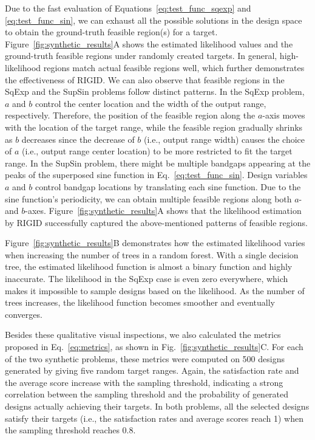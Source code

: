 \documentclass{article}
\begin{document}
Due to the fast evaluation of Equations~\ref{eq:test_func_sqexp} and \ref{eq:test_func_sin}, we can exhaust all the possible solutions in the design space to obtain the ground-truth feasible region(s) for a target. Figure~\ref{fig:synthetic_results}A shows the estimated likelihood values and the ground-truth feasible regions under randomly created targets. In general, high-likelihood regions match actual feasible regions well, which further demonstrates the effectiveness of RIGID. We can also observe that feasible regions in the SqExp and the SupSin problems follow distinct patterns. In the SqExp problem, $a$ and $b$ control the center location and the width of the output range, respectively. Therefore, the position of the feasible region along the $a$-axis moves with the location of the target range, while the feasible region gradually shrinks as $b$ decreases since the decrease of $b$ (i.e., output range width) causes the choice of $a$ (i.e., output range center location) to be more restricted to fit the target range. In the SupSin problem, there might be multiple bandgaps appearing at the peaks of the superposed sine function in Eq.~\ref{eq:test_func_sin}. Design variables $a$ and $b$ control bandgap locations by translating each sine function. Due to the sine function's periodicity, we can obtain multiple feasible regions along both $a$- and $b$-axes.
Figure~\ref{fig:synthetic_results}A shows that the likelihood estimation by RIGID successfully captured the above-mentioned patterns of feasible regions.

Figure~\ref{fig:synthetic_results}B demonstrates how the estimated likelihood varies when increasing the number of trees in a random forest. With a single decision tree, the estimated likelihood function is almost a binary function and highly inaccurate. The likelihood in the SqExp case is even zero everywhere, which makes it impossible to sample designs based on the likelihood. As the number of trees increases, the likelihood function becomes smoother and eventually converges.

Besides these qualitative visual inspections, we also calculated the metrics proposed in Eq.~\ref{eq:metrics}, as shown in Fig.~\ref{fig:synthetic_results}C. For each of the two synthetic problems, these metrics were computed on 500 designs generated by giving five random target ranges. Again, the satisfaction rate and the average score increase with the sampling threshold, indicating a strong correlation between the sampling threshold and the probability of generated designs actually achieving their targets. In both problems, all the selected designs satisfy their targets (i.e., the satisfaction rates and average scores reach 1) when the sampling threshold reaches 0.8.
\end{document}
